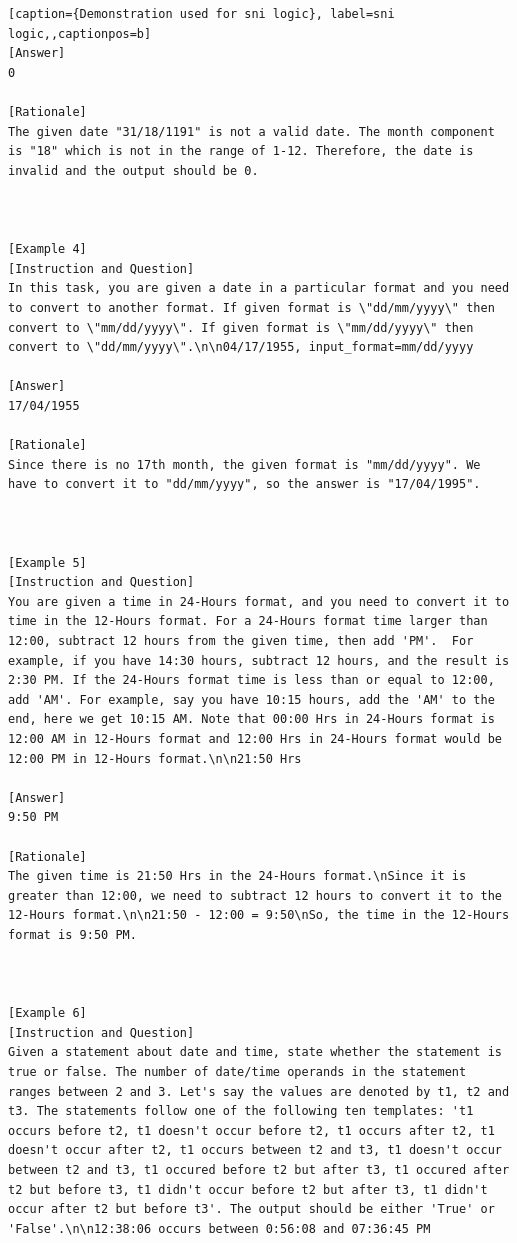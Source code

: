 \begin{lstlisting}[caption={Demonstration used for sni logic}, label=sni logic,,captionpos=b]
[Answer]
0

[Rationale]
The given date "31/18/1191" is not a valid date. The month component is "18" which is not in the range of 1-12. Therefore, the date is invalid and the output should be 0.



[Example 4]
[Instruction and Question]
In this task, you are given a date in a particular format and you need to convert to another format. If given format is \"dd/mm/yyyy\" then convert to \"mm/dd/yyyy\". If given format is \"mm/dd/yyyy\" then convert to \"dd/mm/yyyy\".\n\n04/17/1955, input_format=mm/dd/yyyy

[Answer]
17/04/1955

[Rationale]
Since there is no 17th month, the given format is "mm/dd/yyyy". We have to convert it to "dd/mm/yyyy", so the answer is "17/04/1995".



[Example 5]
[Instruction and Question]
You are given a time in 24-Hours format, and you need to convert it to time in the 12-Hours format. For a 24-Hours format time larger than 12:00, subtract 12 hours from the given time, then add 'PM'.  For example, if you have 14:30 hours, subtract 12 hours, and the result is 2:30 PM. If the 24-Hours format time is less than or equal to 12:00, add 'AM'. For example, say you have 10:15 hours, add the 'AM' to the end, here we get 10:15 AM. Note that 00:00 Hrs in 24-Hours format is 12:00 AM in 12-Hours format and 12:00 Hrs in 24-Hours format would be 12:00 PM in 12-Hours format.\n\n21:50 Hrs

[Answer]
9:50 PM

[Rationale]
The given time is 21:50 Hrs in the 24-Hours format.\nSince it is greater than 12:00, we need to subtract 12 hours to convert it to the 12-Hours format.\n\n21:50 - 12:00 = 9:50\nSo, the time in the 12-Hours format is 9:50 PM.



[Example 6]
[Instruction and Question]
Given a statement about date and time, state whether the statement is true or false. The number of date/time operands in the statement ranges between 2 and 3. Let's say the values are denoted by t1, t2 and t3. The statements follow one of the following ten templates: 't1 occurs before t2, t1 doesn't occur before t2, t1 occurs after t2, t1 doesn't occur after t2, t1 occurs between t2 and t3, t1 doesn't occur between t2 and t3, t1 occured before t2 but after t3, t1 occured after t2 but before t3, t1 didn't occur before t2 but after t3, t1 didn't occur after t2 but before t3'. The output should be either 'True' or 'False'.\n\n12:38:06 occurs between 0:56:08 and 07:36:45 PM


\end{lstlisting}
